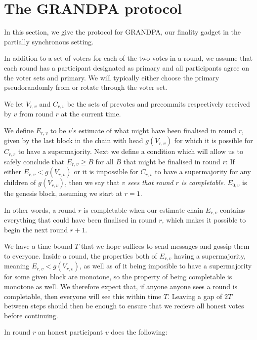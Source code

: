 \documentclass{article}
\begin{document}
\section{The GRANDPA protocol} \label{sec:grandpa}

In this section, we give the protocol for GRANDPA, our finality gadget in the partially synchronous setting.


In addition to a set of voters for each of the two votes in a round, we assume that each round has a participant designated as primary and all participants agree on the voter sets and primary. We will typically either choose the primary pseudorandomly from or rotate through the voter set.

We let $V_{r,v}$ and $C_{r,v}$ be the sets of prevotes and precommits respectively received by $v$ from round $r$ at the current time.

We define $E_{r,v}$ to be $v$'s estimate of what might have been finalised in round $r$, given by the last block in the chain with head $g(V_{r,v})$ for which it is possible for $C_{r,r}$ to have a supermajority. Next we define a condition which will allow us to safely conclude that $E_{r,v} \geq B$ for all $B$ that might be finalised in round $r$:
If either $E_{r,v} < g(V_{r,v})$ or it is impossible for $C_{r,v}$ to have a supermajority for any children of $g(V_{r,v})$, then we say that {\em $v$ sees that round $r$ is completable}.  $E_{0,v}$ is the genesis block, assuming we start at $r=1$.  

In other words, a round $r$ is completable when our estimate chain $E_{r,v}$ contains everything that could have been finalised in round $r$, which makes it possible to begin the next round $r+1$.

We have a time bound $T$ that we hope suffices to send messages and gossip them to everyone.
Inside a round, the properties both of $E_{r,v}$ having a supermajority, meaning $E_{r,v} < g(V_{r,v})$, as well as of it being imposible to have a supermajority for some given block are monotone, so the property of being completable is monotone as well.
We therefore expect that, if anyone anyone sees a round is completable, then everyone will see this within time $T$. Leaving a gap of $2T$ between steps should then be  enough to ensure that we recieve all honest votes before continuing.

In round $r$ an honest participant $v$ does the following:
\end{document}
